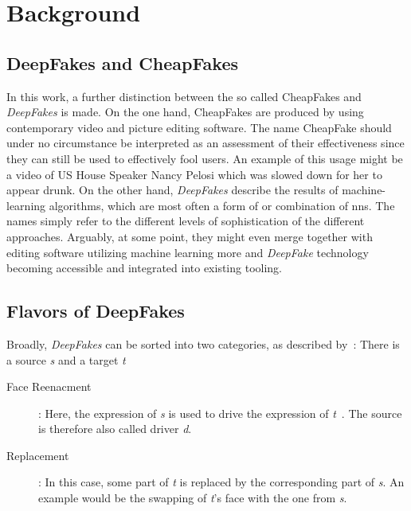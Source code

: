 \section{Background}\label{sect:background}

\subsection{DeepFakes and CheapFakes}
In this work, a further distinction between the so called CheapFakes and \textit{DeepFakes}
is made. On the one hand, CheapFakes are produced by using contemporary video 
and picture editing software. The name CheapFake should under no circumstance be
interpreted as an assessment of their effectiveness since they can still be used
to effectively fool users. An example of this usage might be a video of US House
Speaker Nancy Pelosi which was slowed down for her to appear drunk.
On the other hand, \textit{DeepFakes} describe the results of machine-learning
algorithms, which are most often a form of or combination of \glspl{nn}.
The names simply refer to the different levels of sophistication of the different
approaches. Arguably, at some point, they might even merge together with editing 
software utilizing machine learning more and \textit{DeepFake} technology becoming
accessible and integrated into existing tooling.

\subsection{Flavors of DeepFakes}\label{subsubsect:deepfake-flavors}
Broadly, \textit{DeepFakes} can be sorted into two categories, as described by~\textcite{mirsky_creation_2020}:
There is a source \textit{s} and a target \textit{t}

\begin{description}
    \item[Face Reenacment]: Here, the expression of \textit{s} is used to drive
    the expression of \textit{t}~\cite{mirsky_creation_2020}. The source is
    therefore also called driver \textit{d}.
    \item[Replacement]: In this case, some part of \textit{t} is replaced
    by the corresponding part of \textit{s}. An example would be the swapping of
    \textit{t}'s face with the one from \textit{s}.
\end{description}

